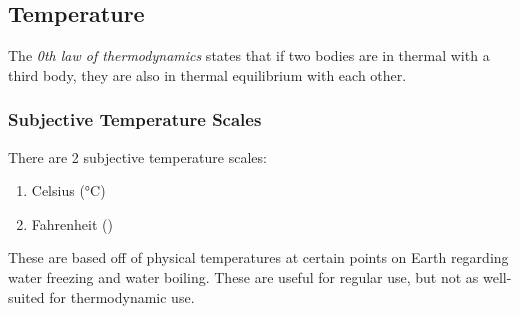 \subsection{Temperature}\label{subsec:Temperature}
\begin{definition}\label{def:0_Law_Thermo}
  The \emph{0th law of thermodynamics} states that if two bodies are in thermal  with a third body, they are also in thermal equilibrium with each other.
\end{definition}

\subsubsection{Subjective Temperature Scales}\label{subsubsec:Subjective_Temp_Scales}
There are 2 subjective temperature scales:
\begin{enumerate}[noitemsep]
\item Celsius (\si{\degreeCelsius})
\item Fahrenheit (\si{\degreeF})
\end{enumerate}

These are based off of physical temperatures at certain points on Earth regarding water freezing and water boiling.
These are useful for regular use, but not as well-suited for thermodynamic use.


